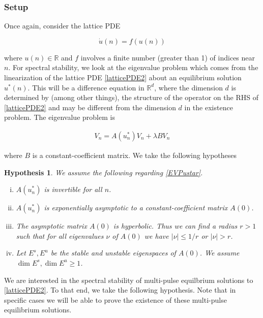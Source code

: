 \documentclass[12pt]{article}
\def\R{{\mathbb R}}
\newtheorem{hypothesis}{Hypothesis}
\begin{document}
\subsubsection{Setup}

Once again, consider the lattice PDE

\begin{equation}\label{latticePDE2}
\dot{u}(n) = f(u(n))
\end{equation}

where $u(n) \in \R$ and $f$ involves a finite number (greater than 1) of indices near $n$. For spectral stability, we look at the eigenvalue problem which comes from the linearization of the lattice PDE \eqref{latticePDE2} about an equilibrium solution $u^*(n)$. This will be a difference equation in $\R^d$, where the dimension $d$ is determined by (among other things), the structure of the operator on the RHS of \eqref{latticePDE2} and may be different from the dimension $d$ in the existence problem. The eigenvalue problem is

\begin{align}\label{EVPustar}
V_n = A(u^*_n) V_n + \lambda B V_n
\end{align}

where $B$ is a constant-coefficient matrix. We take the following hypotheses

\begin{hypothesis}\label{EVPhyp}
We assume the following regarding \eqref{EVPustar}.
\begin{enumerate}[(i)]
\item $A(u^*_n)$ is invertible for all $n$.
\item $A(u^*_n)$ is exponentially asymptotic to a constant-coefficient matrix $A(0)$.
\item The asymptotic matrix $A(0)$ is hyperbolic. Thus we can find a radius $r > 1$ such that for all eigenvalues $\nu$ of $A(0)$ we have $|\nu| \leq 1/r$ or $|\nu| > r$. 
\item Let $E^s, E^u$ be the stable and unstable eigenspaces of $A(0)$. We assume $\dim E^s, \dim E^u \geq 1$.
\end{enumerate}
\end{hypothesis}

We are interested in the spectral stability of multi-pulse equilbrium solutions to \eqref{latticePDE2}. To that end, we take the following hypothesis. Note that in specific cases we will be able to prove the existence of these multi-pulse equilibrium solutions.
\end{document}
